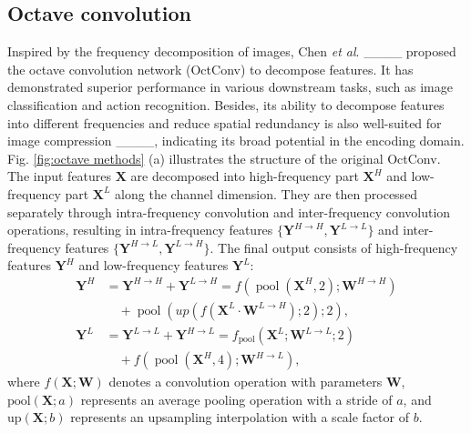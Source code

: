 \subsection{Octave convolution}
Inspired by the frequency decomposition of images, Chen \textit{et al}. ____ proposed the octave convolution network (OctConv) to decompose features. It has demonstrated superior performance in various downstream tasks, such as image classification and action recognition. Besides, its ability to decompose features into different frequencies and reduce spatial redundancy is also well-suited for image compression ____, indicating its broad potential in the encoding domain. Fig. \ref{fig:octave methods} (a) illustrates the structure of the original OctConv. The input features \(\bm{X}\) are decomposed into high-frequency part \(\bm{X}^H\) and low-frequency part \(\bm{X}^L\) along the channel dimension. They are then processed separately through intra-frequency convolution and inter-frequency convolution operations, resulting in intra-frequency features \(\{ \bm{Y}^{H \rightarrow H}, \bm{Y}^{L \rightarrow L} \}\) and inter-frequency features \(\{ \bm{Y}^{H \rightarrow L}, \bm{Y}^{L \rightarrow H} \}\). The final output consists of high-frequency features \(\bm{Y}^H\) and low-frequency features \(\bm{Y}^L\):
\begin{align}
\bm{Y}^H &= \bm{Y}^{H \rightarrow H} + \bm{Y}^{L \rightarrow H} = f\left(\operatorname{pool}\left(\bm{X}^H, 2\right); \bm{W}^{H \rightarrow H}\right) \nonumber \\
& \quad + \operatorname{pool}\left(up\left(f\left(\bm{X}^L \cdot \bm{W}^{L \rightarrow H}\right); 2\right); 2\right), \\
\bm{Y}^L &= \bm{Y}^{L \rightarrow L} + \bm{Y}^{H \rightarrow L} = f_{\text{pool}}\left(\bm{X}^L; \bm{W}^{L \rightarrow L}; 2\right) \nonumber \\
& \quad + f\left(\operatorname{pool}\left(\bm{X}^H, 4\right); \bm{W}^{H \rightarrow L}\right) ,
\end{align}
where \( f(\bm{X}; \bm{W}) \) denotes a convolution operation with parameters \(\bm{W} \), \( \text{pool}(\bm{X}; a) \) represents an average pooling operation with a stride of \( a \), and \( \text{up}(\bm{X}; b) \) represents an upsampling interpolation with a scale factor of \( b \).

